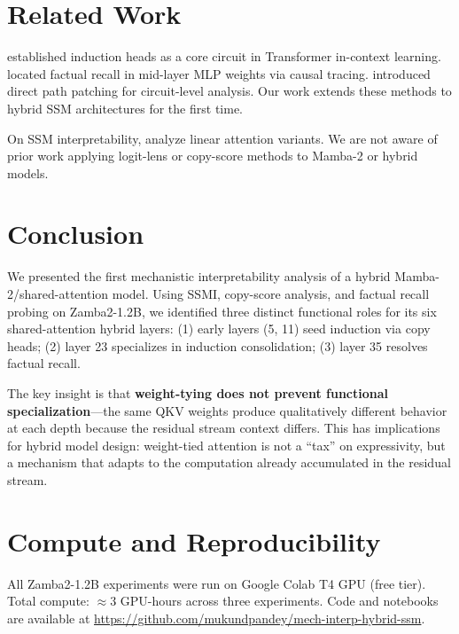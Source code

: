 \documentclass[11pt,a4paper]{article}
\begin{document}
\section{Related Work}

\citet{olsson2022context} established induction heads as a core circuit in Transformer in-context learning. \citet{meng2022locating} located factual recall in mid-layer MLP weights via causal tracing. \citet{goldowsky2023localizing} introduced direct path patching for circuit-level analysis. Our work extends these methods to hybrid SSM architectures for the first time.

On SSM interpretability, \citet{ali2024hidden} analyze linear attention variants. We are not aware of prior work applying logit-lens or copy-score methods to Mamba-2 or hybrid models.

\section{Conclusion}

We presented the first mechanistic interpretability analysis of a hybrid Mamba-2/shared-attention model. Using SSMI, copy-score analysis, and factual recall probing on Zamba2-1.2B, we identified three distinct functional roles for its six shared-attention hybrid layers:
(1) early layers (5, 11) seed induction via copy heads;
(2) layer 23 specializes in induction consolidation;
(3) layer 35 resolves factual recall.

The key insight is that \textbf{weight-tying does not prevent functional specialization}---the same QKV weights produce qualitatively different behavior at each depth because the residual stream context differs. This has implications for hybrid model design: weight-tied attention is not a ``tax'' on expressivity, but a mechanism that adapts to the computation already accumulated in the residual stream.




\appendix

\section{Compute and Reproducibility}

All Zamba2-1.2B experiments were run on Google Colab T4 GPU (free tier). Total compute: ${\approx}3$ GPU-hours across three experiments. Code and notebooks are available at \url{https://github.com/mukundpandey/mech-interp-hybrid-ssm}.
\end{document}
